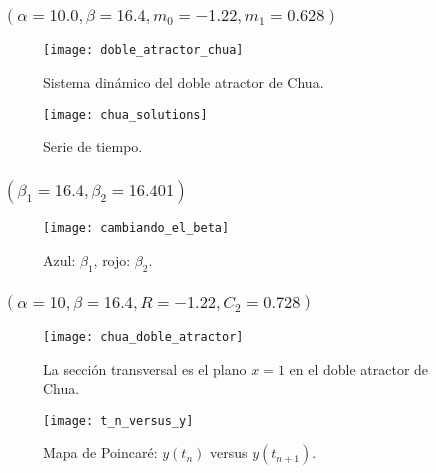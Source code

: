 
\begin{frame}
	\frametitle{\secname\quad$\left(\alpha=10.0, \beta=16.4, m_{0}=-1.22, m_{1}=0.628\right)$}

	\begin{minipage}{0.45\textwidth}
		\begin{figure}[ht!]
			\centering
			\texttt{[image: doble\_atractor\_chua]}
			\caption{Sistema dinámico del doble atractor de Chua.}\label{fig:doble_atractor_chua}
		\end{figure}
	\end{minipage}
	\begin{minipage}{0.45\textwidth}
		\begin{figure}[ht!]
			\centering
			\texttt{[image: chua\_solutions]}
			\caption{Serie de tiempo.}\label{fig:chua_solutions}
		\end{figure}
	\end{minipage}
\end{frame}


\begin{frame}
	\frametitle{\secname\quad$\left(\beta_{1}=16.4,\beta_{2}=16.401\right)$}

	\begin{figure}[ht!]
		\centering
		\texttt{[image: cambiando\_el\_beta]}
		\caption{Azul: $\beta_{1}$, rojo: $\beta_{2}$.}\label{fig:lyapunov}
	\end{figure}

\end{frame}

\begin{frame}
	\frametitle{\secname\quad$\left(\alpha=10,\beta=16.4,R=-1.22,C_{2}=0.728\right)$}

	\begin{minipage}{0.45\textwidth}
		\begin{figure}[ht!]
			\centering
			\texttt{[image: chua\_doble\_atractor]}
			\caption{La sección transversal es el plano $x=1$ en el doble atractor de Chua.}\label{fig:chua_doble_atractor}
		\end{figure}
	\end{minipage}
	\begin{minipage}{0.45\textwidth}
		\begin{figure}[ht!]
			\centering
			\texttt{[image: t\_n\_versus\_y]}
			\caption{Mapa de Poincaré: $y\left(t_{n}\right)$ versus $y\left(t_{n+1}\right)$.}\label{fig:chua_solutions}
		\end{figure}
	\end{minipage}
\end{frame}

